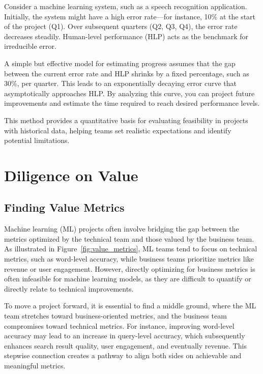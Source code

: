 \documentclass[12pt,openany, draft]{book}
\begin{document}
Consider a machine learning system, such as a speech recognition application. Initially, the system might have a high error rate—for instance, 10\% at the start of the project (Q1). Over subsequent quarters (Q2, Q3, Q4), the error rate decreases steadily. Human-level performance (HLP) acts as the benchmark for irreducible error. \newline

A simple but effective model for estimating progress assumes that the gap between the current error rate and HLP shrinks by a fixed percentage, such as 30\%, per quarter. This leads to an exponentially decaying error curve that asymptotically approaches HLP. By analyzing this curve, you can project future improvements and estimate the time required to reach desired performance levels. \newline

This method provides a quantitative basis for evaluating feasibility in projects with historical data, helping teams set realistic expectations and identify potential limitations. \newline



\section{Diligence on Value}

\subsection{Finding Value Metrics}

Machine learning (ML) projects often involve bridging the gap between the metrics optimized by the technical team and those valued by the business team. As illustrated in Figure~\ref{fig:value_metrics}, ML teams tend to focus on technical metrics, such as word-level accuracy, while business teams prioritize metrics like revenue or user engagement. However, directly optimizing for business metrics is often infeasible for machine learning models, as they are difficult to quantify or directly relate to technical improvements. \newline

To move a project forward, it is essential to find a middle ground, where the ML team stretches toward business-oriented metrics, and the business team compromises toward technical metrics. For instance, improving word-level accuracy may lead to an increase in query-level accuracy, which subsequently enhances search result quality, user engagement, and eventually revenue. This stepwise connection creates a pathway to align both sides on achievable and meaningful metrics. \newline
\end{document}
